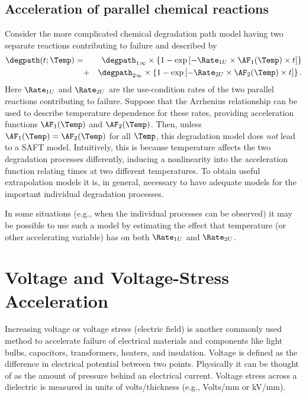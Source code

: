 \subsection{Acceleration of parallel chemical reactions}
\label{section:parallel.reaction}
Consider the more complicated chemical degradation path model
having two separate reactions contributing to failure
and described by
\begin{eqnarray*}
\degpath(t;\Temp) =& &\degpath_{1 \infty} \times
\left \{1 -  \exp \left [-\Rate_{1U} \times \AF_{1}(\Temp)
\times t \right ]
\right \} \\  & + & \degpath_{2 \infty} \times
\left \{1 -  \exp \left [-\Rate_{2U} \times \AF_{2}(\Temp) \times t \right ] \right \}.
\end{eqnarray*}
Here $\Rate_{1U}$ and $\Rate_{2U}$ are the use-condition rates of
the two parallel reactions contributing to failure. Suppose that the
Arrhenius relationship can be used to describe temperature dependence for
these rates,
providing acceleration functions $\AF_{1}(\Temp)$ and
$\AF_{2}(\Temp)$.
Then, unless $\AF_{1}(\Temp)=\AF_{2}(\Temp)$ for all $\Temp$, this
degradation model does {\em not} lead to a SAFT model.  Intuitively,
this is because temperature affects the two degradation processes
differently, inducing a nonlinearity into the acceleration function
relating times at two different temperatures.  To obtain useful
extrapolation models it is, in general, necessary to have adequate
models for the important individual degradation processes.

In some situations (e.g., when the individual
processes can be observed) it may be possible to use such a model by
estimating the effect that temperature (or other accelerating variable)
has on both $\Rate_{1U}$ and $\Rate_{2U}$.

\section{Voltage and Voltage-Stress Acceleration}
\label{section:voltage.at.models}
Increasing voltage or voltage stress (electric field)
is another commonly used method
to accelerate failure of electrical materials and components like
light bulbs, capacitors, transformers, heaters, and insulation.
Voltage is defined as the difference in electrical potential between
two points.  Physically it can be thought of as the amount of pressure
behind an electrical current. Voltage stress across a dielectric is
measured in units of volts/thickness (e.g., Volts/mm or kV/mm).

